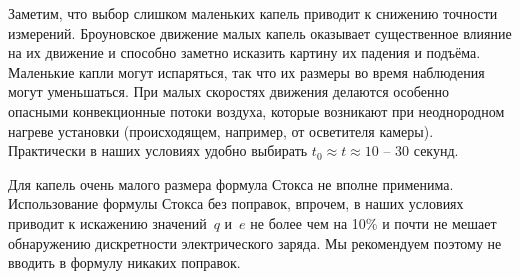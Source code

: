 Заметим, что выбор слишком маленьких капель приводит к снижению точности
измерений. Броуновское движение малых капель оказывает существенное влияние на
их движение и способно заметно исказить картину их падения и подъёма. Маленькие
капли могут испаряться, так что их размеры во время наблюдения могут
уменьшаться. При малых скоростях движения делаются особенно опасными
конвекционные потоки воздуха, которые возникают при неоднородном нагреве
установки (происходящем, например, от осветителя камеры). Практически в наших
условиях удобно выбирать $t_0\approx t\approx 10$ -- 30 секунд.

Для капель очень малого размера формула Стокса не вполне применима.
Использование формулы Стокса без поправок, впрочем, в наших условиях приводит к
искажению значений~$q$ и~$e$ не более чем на 10\% и почти не мешает обнаружению
дискретности электрического заряда. Мы рекомендуем поэтому не вводить в формулу
никаких поправок.


